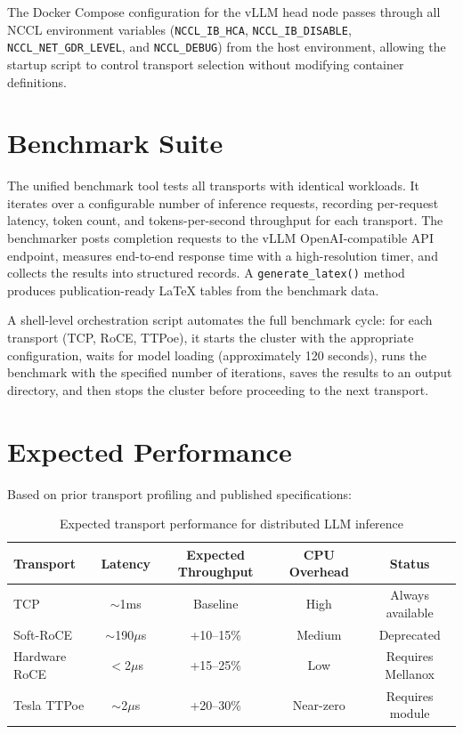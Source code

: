 \documentclass[10pt,letterpaper]{article}
\begin{document}
The Docker Compose configuration for the vLLM head node passes through all NCCL environment variables (\texttt{NCCL\_IB\_HCA}, \texttt{NCCL\_IB\_DISABLE}, \texttt{NCCL\_NET\_GDR\_LEVEL}, and \texttt{NCCL\_DEBUG}) from the host environment, allowing the startup script to control transport selection without modifying container definitions.

\section{Benchmark Suite}

The unified benchmark tool tests all transports with identical workloads. It iterates over a configurable number of inference requests, recording per-request latency, token count, and tokens-per-second throughput for each transport. The benchmarker posts completion requests to the vLLM OpenAI-compatible API endpoint, measures end-to-end response time with a high-resolution timer, and collects the results into structured records. A \texttt{generate\_latex()} method produces publication-ready LaTeX tables from the benchmark data.

A shell-level orchestration script automates the full benchmark cycle: for each transport (TCP, RoCE, TTPoe), it starts the cluster with the appropriate configuration, waits for model loading (approximately 120 seconds), runs the benchmark with the specified number of iterations, saves the results to an output directory, and then stops the cluster before proceeding to the next transport.

\section{Expected Performance}

Based on prior transport profiling and published specifications:

\begin{table}[H]
\centering
\small
\begin{tabular}{@{}lcccc@{}}
\toprule
\textbf{Transport} & \textbf{Latency} & \textbf{Expected Throughput} & \textbf{CPU Overhead} & \textbf{Status} \\
\midrule
TCP & $\sim$1ms & Baseline & High & Always available \\
Soft-RoCE & $\sim$190$\mu$s & +10--15\% & Medium & Deprecated \\
Hardware RoCE & $<$2$\mu$s & +15--25\% & Low & Requires Mellanox \\
Tesla TTPoe & $\sim$2$\mu$s & +20--30\% & Near-zero & Requires module \\
\bottomrule
\end{tabular}
\caption{Expected transport performance for distributed LLM inference}
\end{table}
\end{document}

